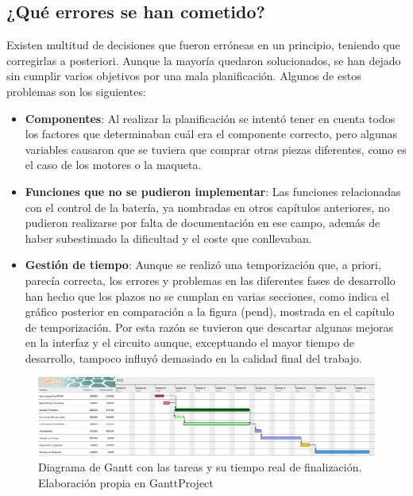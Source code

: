 \subsection{¿Qué errores se han cometido?}

Existen multitud de decisiones que fueron erróneas en un principio, teniendo que corregirlas a posteriori. Aunque la mayoría quedaron solucionados, se han dejado sin cumplir varios objetivos por una mala planificación. Algunos de estos problemas son los siguientes:

\begin{itemize}
    \item \textbf{Componentes}: Al realizar la planificación se intentó tener en cuenta todos los factores que determinaban cuál era el componente correcto, pero algunas variables causaron que se tuviera que comprar otras piezas diferentes, como es el caso de los motores o la maqueta. 
    \item \textbf{Funciones que no se pudieron implementar}: Las funciones relacionadas con el control de la batería, ya nombradas en otros capítulos anteriores, no pudieron realizarse por falta de documentación en ese campo, además de haber subestimado la dificultad y el coste que conllevaban. 
    \item \textbf{Gestión de tiempo}: Aunque se realizó una temporización que, a priori, parecía correcta, los errores y problemas en las diferentes fases de desarrollo han hecho que los plazos no se cumplan en varias secciones, como indica el gráfico posterior en comparación a la figura (pend), mostrada en el capítulo de temporización. Por esta razón se tuvieron que descartar algunas mejoras en la interfaz y el circuito aunque, exceptuando el mayor tiempo de desarrollo, tampoco influyó demasiado en la calidad final del trabajo. 
\end{itemize}


\begin{figure}[h]
    \centering
    \includegraphics[width=1\textwidth]{imagenes/Gantt_final.png}
    \caption{Diagrama de Gantt con las tareas y su tiempo real de finalización. Elaboración propia en GanttProject}
\end{figure}

